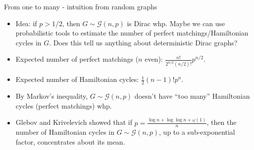 \documentclass{beamer}
\theoremstyle{plain}
\begin{document}





	\begin{frame}{From one to many - intuition from random graphs}
		\begin{itemize}
			\item Idea: if $p>1/2$, then $G\sim \mathcal{G}(n,p)$ is Dirac whp.
			Maybe we can use probabilistic tools to estimate the number of perfect matchings/Hamiltonian cycles in $G$.
			Does this tell us anything about deterministic Dirac graphs?

			\pause

			\item Expected number of perfect matchings ($n$ even): $\frac{n!}{2^{n/2}(n/2)!}p^{n/2}$.

			\pause

			\item Expected number of Hamiltonian cycles: $\frac{1}{2}(n-1)!p^n$.

			\pause

			\item By Markov's inequality, $G\sim \mathcal{G}(n,p)$ doesn't have ``too many'' Hamiltonian cycles (perfect matchings) whp.

			\pause

			\item Glebov and Krivelevich showed that if $p = \frac{\log n + \log \log n + \omega(1)}{n}$, then the number of Hamiltonian cycles in $G\sim \mathcal{G}(n,p)$, up to a sub-exponential factor, concentrates about its mean.




		\end{itemize}	
	\end{frame}
\end{document}
